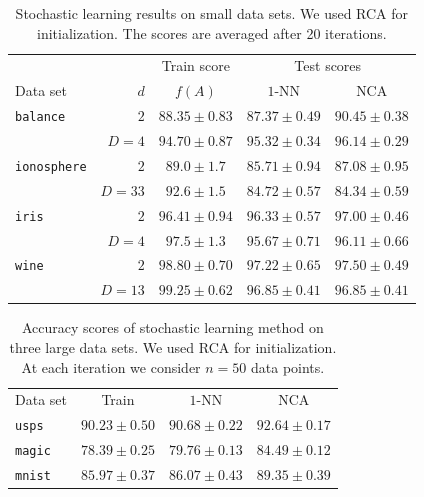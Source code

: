     \begin{table}
      \centering\begin{tabular}{lrccc}
      \toprule
	      &     & Train score  & \multicolumn{2}{c}{Test scores}\\
      \cmidrule(r){3-3} \cmidrule(r){4-5}
      Data set & $d$ & $f(A)$ & $1$-NN & NCA \\
      \midrule
	\texttt{balance}&$2$&$88.35 \pm 0.83$&$87.37 \pm 0.49$&$90.45 \pm 0.38$\\  
	&$D=4$&$94.70 \pm 0.87$&$95.32 \pm 0.34$&$96.14 \pm 0.29$\\ 
	\midrule
	\texttt{ionosphere}&$2$&$89.0 \pm 1.7$&$85.71 \pm 0.94$&$87.08 \pm 0.95$\\
	&$D=33$&$92.6 \pm 1.5$&$84.72 \pm 0.57$&$84.34 \pm 0.59$\\ 
	\midrule
	\texttt{iris}&$2$&$96.41 \pm 0.94$&$96.33 \pm 0.57$&$97.00 \pm 0.46$\\ 
	&$D=4$&$97.5 \pm 1.3$&$95.67 \pm 0.71$&$96.11 \pm 0.66$\\ 
	\midrule
	\texttt{wine}&$2$&$98.80 \pm 0.70$&$97.22 \pm 0.65$&$97.50 \pm 0.49$\\ 
	&$D=13$&$99.25 \pm 0.62$&$96.85 \pm 0.41$&$96.85 \pm 0.41$\\ 
      \bottomrule
      \end{tabular}
      \label{tab:sl-1}
      \caption{Stochastic learning results on small data sets. We used RCA for initialization. The scores are averaged after 20 iterations.}
    \end{table}

        \begin{table}
            	\centering
            	\begin{tabular}{lccc}
            	\toprule
            	Data set & Train & $1$-NN & NCA \\
            	\cmidrule(r){2-2}\cmidrule(r){3-3}\cmidrule(r){4-4} 
            	\texttt{usps}&$90.23  \pm 0.50$&$90.68 \pm 0.22$&$92.64 \pm 0.17$\\
            	\texttt{magic}&$78.39 \pm 0.25$&$79.76 \pm 0.13$&$84.49 \pm 0.12$\\
            	\texttt{mnist}&$85.97 \pm 0.37$&$86.07 \pm 0.43$&$89.35 \pm 0.39$\\
            	 \bottomrule
            	\end{tabular}
		\label{tab:sl-2}
		\caption{Accuracy scores of stochastic learning method on three large data sets. We used RCA for initialization. At each iteration we consider $n=50$ data points.}
        \end{table}

